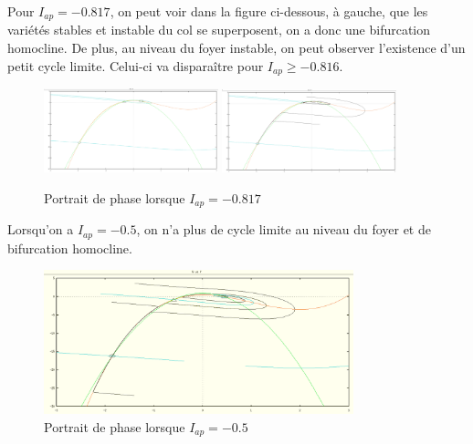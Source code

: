 \documentclass[12pt,a4paper,onecolumn]{article}
\begin{document}
Pour $I_{ap} = -0.817$, on peut voir dans la figure ci-dessous, à gauche, que les variétés stables et instable du col se superposent, on a donc une bifurcation homocline. De plus, au niveau du foyer instable, on peut observer l'existence d'un petit cycle limite. Celui-ci va disparaître pour $I_{ap} \geq -0.816$.
\begin{figure}[H]
	\centering

	\includegraphics[width=0.45\textwidth]{I-0_817bis.png}
	\includegraphics[width=0.45\textwidth]{I-0_817.png}

	\caption{Portrait de phase lorsque $I_{ap} = -0.817$ }
\end{figure}

Lorsqu'on a $I_{ap} = -0.5$, on n'a plus de cycle limite au niveau du foyer et de bifurcation homocline.
\begin{figure}[H]
	\centering
	\includegraphics[width=0.8\textwidth]{I-0_5.png}
	\caption{Portrait de phase lorsque $I_{ap} = -0.5$ }
\end{figure}
\end{document}
